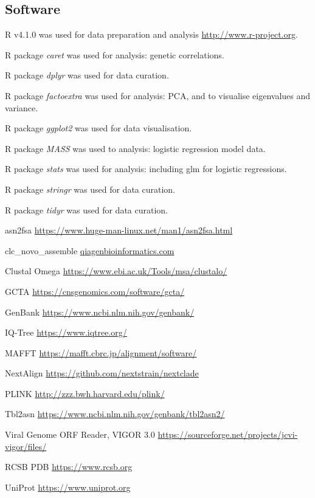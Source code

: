 \documentclass{article} %
\begin{document}
\subsection{Software}
\begin{description}[noitemsep]

\item R v4.1.0 was used for data preparation and analysis \url{http://www.r-project.org}.
\item R package \textit{caret} was used for analysis: genetic correlations.
\item R package \textit{dplyr} was used for data curation.
\item R package \textit{factoextra} was used for analysis: PCA, and to visualise eigenvalues and variance.
\item R package \textit{ggplot2} was used for data visualisation.
\item R package \textit{MASS} was used to analysis: logistic regression model data.
\item R package \textit{stats} was used for analysis: including glm for logistic regressions. 
\item R package \textit{stringr} was used for data curation.
\item R package \textit{tidyr} was used for data curation.
\item asn2fsa \url{https://www.huge-man-linux.net/man1/asn2fsa.html}
\item clc\_novo\_assemble \href{https://resources.qiagenbioinformatics.com/manuals
/clcgenomicsworkbench/852/index.php?manual=De_novo_assembly.html}{qiagenbioinformatics.com} \
\item Clustal Omega \url{https://www.ebi.ac.uk/Tools/msa/clustalo/}
\item GCTA \url{https://cnsgenomics.com/software/gcta/}
\item GenBank \url{https://www.ncbi.nlm.nih.gov/genbank/}
\item IQ-Tree \url{https://www.iqtree.org/}
\item MAFFT \url{https://mafft.cbrc.jp/alignment/software/} \cite{katoh2013mafft}
\item NextAlign \url{https://github.com/nextstrain/nextclade}
\item PLINK \url{http://zzz.bwh.harvard.edu/plink/}
\item Tbl2asn \url{https://www.ncbi.nlm.nih.gov/genbank/tbl2asn2/}
\item Viral Genome ORF Reader, VIGOR 3.0 \url{https://sourceforge.net/projects/jcvi-vigor/files/}
\item RCSB PDB \url{https://www.rcsb.org}
\item UniProt \url{https://www.uniprot.org}

\end{description}
\end{document}
